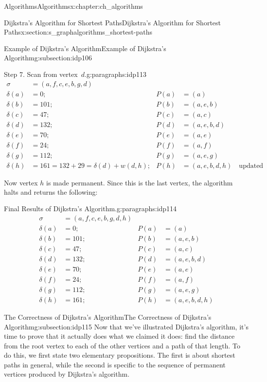 \documentclass[oneside,10pt,]{book}
\numberwithin{equation}{section}
\newcommand{\amp}{&}
\begin{document}
\begin{chapterptx}{Algorithms}{}{Algorithms}{}{}{x:chapter:ch_algorithms}
\begin{sectionptx}{Dijkstra's Algorithm for Shortest Paths}{}{Dijkstra's Algorithm for Shortest Paths}{}{}{x:section:s_graphalgorithms_shortest-paths}
\begin{subsectionptx}{Example of Dijkstra's Algorithm}{}{Example of Dijkstra's Algorithm}{}{}{g:subsection:idp106}
\begin{paragraphs}{Step 7.  Scan from vertex~\(d\).}{g:paragraphs:idp113}
\begin{align*}
\sigma\amp=(a,f,c,e,b,g,d)\\
\delta(a)\amp=0; \amp P(a)\amp=(a)\\
\delta(b)\amp=101; \amp P(b)\amp=(a,e,b)\\
\delta(c)\amp=47; \amp P(c)\amp=(a,c)\\
\delta(d)\amp= 132; \amp P(d)\amp=(a,e,b,d)\\
\delta(e)\amp=70; \amp P(e)\amp=(a,e)\\
\delta(f)\amp=24; \amp P(f)\amp=(a,f)\\
\delta(g)\amp=112; \amp P(g)\amp=(a,e,g)\\
\delta(h)\amp=161 = 132+29=\delta(d)+w(d,h); \amp P(h)\amp=(a,e,b,d,h)\quad\text{updated}
\end{align*}
%
\par
Now vertex \(h\) is made permanent. Since this is the last vertex, the algorithm halts and returns the following:%
\end{paragraphs}%
\begin{paragraphs}{Final Results of Dijkstra's Algorithm.}{g:paragraphs:idp114}%
%
\begin{align*}
\sigma\amp=(a,f,c,e,b,g,d,h)\\
\delta(a)\amp=0; \amp P(a)\amp=(a)\\
\delta(b)\amp=101; \amp P(b)\amp=(a,e,b)\\
\delta(c)\amp=47; \amp P(c)\amp=(a,c)\\
\delta(d)\amp= 132; \amp P(d)\amp=(a,e,b,d)\\
\delta(e)\amp=70; \amp P(e)\amp=(a,e)\\
\delta(f)\amp=24; \amp P(f)\amp=(a,f)\\
\delta(g)\amp=112; \amp P(g)\amp=(a,e,g)\\
\delta(h)\amp=161; \amp P(h)\amp=(a,e,b,d,h)
\end{align*}
%
\end{paragraphs}%
\end{subsectionptx}
%
%
\typeout{************************************************}
\typeout{************************************************}
%
\begin{subsectionptx}{The Correctness of Dijkstra's Algorithm}{}{The Correctness of Dijkstra's Algorithm}{}{}{g:subsection:idp115}
Now that we've illustrated Dijkstra's algorithm, it's time to prove that it actually does what we claimed it does: find the distance from the root vertex to each of the other vertices and a path of that length. To do this, we first state two elementary propositions. The first is about shortest paths in general, while the second is specific to the sequence of permanent vertices produced by Dijkstra's algorithm.%

\end{subsectionptx}
\end{sectionptx}
\end{chapterptx}
\end{document}

